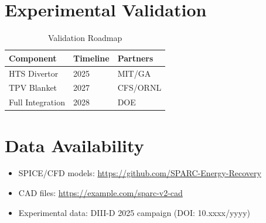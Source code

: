 \documentclass{article}
\begin{document}
\section{Experimental Validation}
\begin{table}[ht]
    \centering
    \caption{Validation Roadmap}
    \label{tab:roadmap}
    \begin{tabular}{lll}
    \toprule
    Component & Timeline & Partners \\
    \midrule
    HTS Divertor & 2025 & MIT/GA \\
    TPV Blanket & 2027 & CFS/ORNL \\
    Full Integration & 2028 & DOE \\
    \bottomrule
    \end{tabular}
\end{table}

\section*{Data Availability}
\begin{itemize}
\item SPICE/CFD models: \url{https://github.com/SPARC-Energy-Recovery}
\item CAD files: \url{https://example.com/sparc-v2-cad}
\item Experimental data: DIII-D 2025 campaign (DOI: 10.xxxx/yyyy)
\end{itemize}



\end{document}
